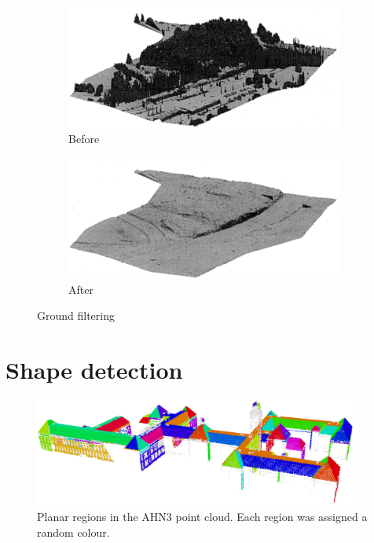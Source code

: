 \begin{figure}
  \centering
  \begin{subfigure}[b]{0.48\linewidth}
    \centering
    \includegraphics[width=\textwidth]{figs/axelsson-before.png}
    \caption{Before}
  \end{subfigure}
  \quad
  \begin{subfigure}[b]{0.48\linewidth}
    \centering
    \includegraphics[width=\textwidth]{figs/axelsson-after.png}
    \caption{After}
  \end{subfigure}
\caption{Ground filtering \citep{axelsson2000generation}}
\label{fig:axelsson}
\end{figure}


%
\section{Shape detection}
\label{sec:shape-detection}

\begin{figure}[h]
	\centering
	\includegraphics[width=0.95\textwidth]{figs/bk-planes.png}
	\caption{Planar regions in the AHN3 point cloud. Each region was assigned a random colour.}
	\label{fig:bk-planes}
\end{figure}

